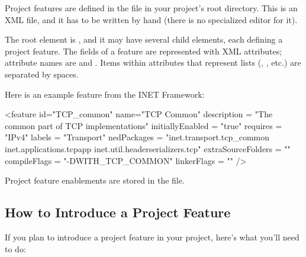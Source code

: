 Project features are defined in the  file in your project's
root directory. This is an XML file, and it has to be written by hand
(there is no specialized editor for it).

The root element is , and it may have several 
child elements, each defining a project feature. The fields of a feature
are represented with XML attributes; attribute names are  and . Items within attributes
that represent lists (, , etc.) are separated by spaces.

Here is an example feature from the INET Framework:
\begin{filelisting}
<feature
  id="TCP_common"
  name="TCP Common"
  description = "The common part of TCP implementations"
  initiallyEnabled = "true"
  requires = "IPv4"
  labels = "Transport"
  nedPackages = "inet.transport.tcp_common
                 inet.applications.tcpapp
                 inet.util.headerserializers.tcp"
  extraSourceFolders = ""
  compileFlags = "-DWITH_TCP_COMMON"
  linkerFlags = ""
  />
\end{filelisting}

Project feature enablements are stored in the  file.


\subsection{How to Introduce a Project Feature}
\label{sec:build-sim-progs:introducing-project-features}

If you plan to introduce a project feature in your project, here's what you'll need
to do:

